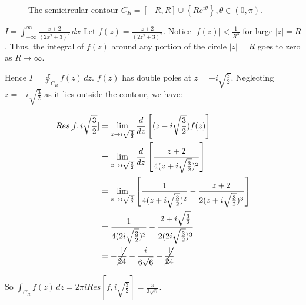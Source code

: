 \documentclass{../../physics_notes}
\begin{document}
\begin{figure}
	\centering
	\caption{The semicircular contour $C_R = [-R, R]\cup \left\{Re^{i\theta}\right\}, \theta \in (0,\pi)$.}
	\label{fig:semicircle_contour}
\end{figure}

\begin{example}{$I = \int_{-\infty}^\infty \frac{x+2}{(2x^2 + 3)^2}\, dx$}
	Let $f(z) = \frac{z + 2}{(2z^2 + 3)^2}$. Notice $|f(z)| < \frac{1}{R^3}$ for large $|z| = R$. Thus, the integral of $f(z)$ around any portion of the circle $|z| = R$ goes to zero as $R\to\infty$. 

	Hence $I = \oint_{C_R} f(z)\, dz$. $f(z)$ has double poles at $z = \pm i\sqrt{\frac{3}{2}}$. Neglecting $z = -i\sqrt{\frac{3}{2}}$ as it lies outside the contour, we have:

	\begin{align*}
		Res[f,i\sqrt{\frac{3}{2}}] &= \lim_{z\to i\sqrt{\frac{3}{2}}} \frac{d}{dz}\left[(z - i\sqrt{\frac{3}{2}})f(z)\right] \\
		&= \lim_{z\to i\sqrt{\frac{3}{2}}} \frac{d}{dz}\left[\frac{z+2}{4(z+i\sqrt{\frac{3}{2}})^2}\right] \\
		&= \lim_{z\to i\sqrt{\frac{3}{2}}} \left[\frac{1}{4(z + i\sqrt\frac{3}{2})^2} - \frac{z+2}{2(z + i\sqrt{\frac{3}{2}})^3}\right] \\
		&= \frac{1}{4(2i\sqrt{\frac{3}{2}})^2} - \frac{2 + i\sqrt{\frac{3}{2}}}{2(2i\sqrt{\frac{3}{2}})^3} \\
		&= -\cancel{\frac{1}{24}} - \frac{i}{6\sqrt{6}} + \cancel{\frac{1}{24}}
	\end{align*}

	So $\int_{C_R} f(z)\, dz = 2\pi i Res[f, i\sqrt{\frac{3}{2}}] = \frac{\pi}{3\sqrt{6}}$.
\end{example}
\end{document}
